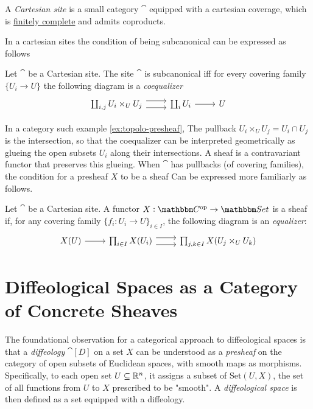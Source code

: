 \documentclass[a4paper,11pt]{article}  %
\begin{document}
\begin{definition}
	A \emph{Cartesian site} is a small category \( \cat \) equipped with a cartesian coverage, which is \href{https://ncatlab.org/nlab/show/finitely+complete+category\#definition}{finitely complete} and admits coproducts.
\end{definition}


In a cartesian sites the condition of being subcanonical can be expressed as follows
\begin{lemma}\label{lem:subcanon-bloh}
	Let $\cat$ be a Cartesian site.
	The site $\cat$ is subcanonical iff for every covering family $\{U_i\to U\}$ the following diagram is a \emph{coequalizer}
		\begin{equation}
			\begin{tikzcd}
				\coprod_{i,j} U_i \times_U U_j \ar[r, yshift=4px]\ar[r, yshift=-4px] & \coprod_i U_i \ar[r] & U
			\end{tikzcd}		
		\end{equation}
\end{lemma}
%
In a category such example \cref{ex:topolo-presheaf}, The pullback $U_i\times_U U_j = U_i \cap U_j$ is the intersection, so that the
coequalizer can be interpreted geometrically as glueing the open subsets $U_i$ along their intersections. 
A sheaf is a contravariant functor that preserves this glueing.
When $\cat$ has pullbacks (of covering families), the condition for a presheaf \(X\) to be a sheaf Can be expressed more familiarly as follows.

\begin{lemma}
	Let $\cat$ be a Cartesian site.
	A functor $X: \cat^\op \to \Set$ is a sheaf if, for any covering family \(\{f_i : U_i \to U\}_{i \in I}\), the following diagram is an \emph{equalizer}:
	\begin{equation}
		\begin{tikzcd}
			X(U) \ar[r] & \prod_{i \in I} X(U_i) \ar[r, yshift=4px]\ar[r, yshift=-4px] & \prod_{j,k \in I} X(U_j \times_U U_k) 
		\end{tikzcd}	
	\end{equation}
\end{lemma}


\section{ Diffeological Spaces as a Category of Concrete Sheaves}
%
The foundational observation for a categorical approach to diffeological spaces is that a \emph{diffeology} \(\cat[D]\) on a set \(X\) can be understood as a \emph{presheaf} on the category of open subsets of Euclidean spaces, with smooth maps as morphisms. 
Specifically, to each open set \(U \subseteq \mathbb{R}^n\), it assigns a subset of \(\text{Set}(U, X)\), the set of all functions from \(U\) to \(X\) prescribed to be "smooth". 
A \emph{diffeological space} is then defined as a set equipped with a diffeology.
\end{document}
